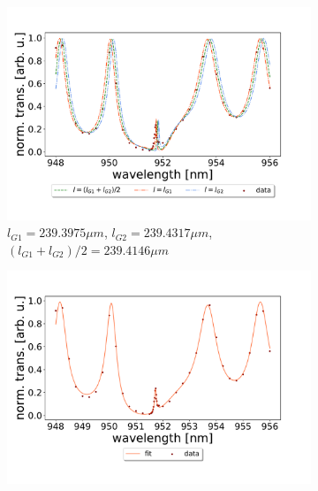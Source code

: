 \begin{figure}[h!]
    \centering
    \begin{subfigure}[b]{0.49\textwidth}
        \centering
        \includegraphics[width=\textwidth]{figures/results/238um_long_scan_sim_comparison.pdf}
        \caption{$l_{G1} = 239.3975 \mu m$, $l_{G2} = 239.4317 \mu m$, $(l_{G1} + l_{G2})/2 = 239.4146 \mu m$}
        \label{fig:238um_long_scan_sim_comparison}
    \end{subfigure}
    \begin{subfigure}[b]{0.49\textwidth}
        \centering
        \includegraphics[width=\textwidth]{figures/results/238um_long_scan_fit.pdf}
        \caption{}
        \label{fig:238um_long_scan_fit}
    \end{subfigure}
\end{figure}


